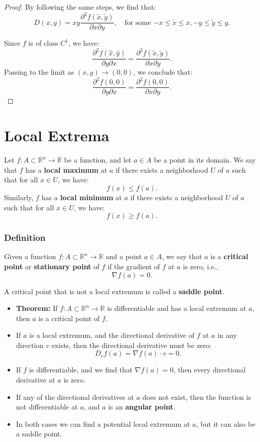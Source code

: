 \documentclass[11pt]{article}
\begin{document}
\begin{proof}
    By following the same steps, we find that:
    \[D(x, y) = x y \frac{\partial^2 f(\tilde{x}, \tilde{y})}{\partial x \partial y}, \quad \text{for some \(-x \leq \tilde{x} \leq x, -y \leq \tilde{y} \leq y\)}.\]

    Since \(f\) is of class \(C^1\), we have:
    \[\frac{\partial^2 f(\hat{x}, \hat{y})}{\partial y \partial x} = \frac{\partial^2 f(\tilde{x}, \tilde{y})}{\partial x \partial y}.\]
    Passing to the limit as \((x, y) \to (0, 0)\), we conclude that:
    \[\frac{\partial^2 f(0, 0)}{\partial y \partial x} = \frac{\partial^2 f(0, 0)}{\partial x \partial y}.\]
\end{proof}
\pagebreak
\section{Local Extrema}
Let \(f : A \subset \mathbb{R}^n \to \mathbb{R}\) be a function, and let \(a \in A\) be a point in its domain. We say that \(f\) has a \textbf{local maximum} at \(a\) if there exists a neighborhood \(U\) of \(a\) such that for all \(x \in U\), we have:
\[ f(x) \leq f(a). \]
Similarly, \(f\) has a \textbf{local minimum} at \(a\) if there exists a neighborhood \(U\) of \(a\) such that for all \(x \in U\), we have:
\[ f(x) \geq f(a). \]

\subsubsection*{Definition}
Given a function \(f : A \subset \mathbb{R}^n \to \mathbb{R}\) and a point \(a \in A\), we say that \(a\) is a \textbf{critical point} or \textbf{stationary point} of \(f\) if the gradient of \(f\) at \(a\) is zero, i.e.,
\[ \nabla f(a) = 0. \]

\begin{remark}
    A critical point that is not a local extremum is called a \textbf{saddle point}.

    \begin{itemize}
        \item \textbf{Theorem: } If \(f : A \subset \mathbb{R}^n \to \mathbb{R}\) is differentiable and has a local extremum at \(a\), then \(a\) is a critical point of \(f\).
        \item If \(a\) is a local extremum, and the directional derivative of \(f\) at \(a\) in any direction \(v\) exists, then the directional derivative must be zero:
        \[ D_v f(a) = \nabla f(a) \cdot v = 0. \]
        \item If \(f\) is differentiable, and we find that \(\nabla f(a) = 0\), then every directional derivative at \(a\) is zero.
        \item If any of the directional derivatives at \(a\) does not exist, then the function is not differentiable at \(a\), and \(a\) is an \textbf{angular point}.
        \item In both cases we can find a potential local extremum at \(a\), but it can also be a saddle point.
    \end{itemize}
\end{remark}
\end{document}
